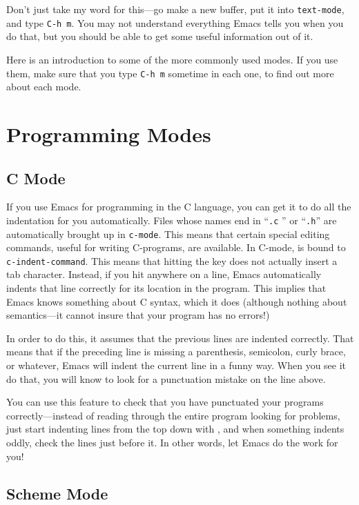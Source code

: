         Don't just take my word for this---go make a new buffer, put
it into {\tt text-mode}, and type {\tt C-h~m}.  You may not understand
everything Emacs tells you when you do that, but you should be able to
get some useful information out of it.

        Here is an introduction to some of the more commonly used
modes.  If you use them, make sure that you type {\tt C-h~m} sometime
in each one, to find out more about each mode.

\section{Programming Modes}

\subsection{C Mode}

        If you use Emacs for programming in the C language, you can
get it to do all the indentation for you automatically.  Files whose
names end in ``{\tt .c} '' or ``{\tt .h}'' are automatically brought
up in {\tt c-mode}.  This means that certain special editing commands,
useful for writing C-programs, are available.  In C-mode,  is
bound to {\tt c-indent-command}.  This means that hitting the
 key does not actually insert a tab character.  Instead, if
you hit  anywhere on a line, Emacs automatically indents
that line correctly for its location in the program.  This implies
that Emacs knows something about C syntax, which it does (although
nothing about semantics---it cannot insure that your program has no
errors!)

        In order to do this, it assumes that the previous lines are
indented correctly.  That means that if the preceding line is missing
a parenthesis, semicolon, curly brace, or whatever, Emacs will indent
the current line in a funny way.  When you see it do that, you will
know to look for a punctuation mistake on the line above.
        
        You can use this feature to check that you have punctuated
your programs correctly---instead of reading through the entire
program looking for problems, just start indenting lines from the top
down with , and when something indents oddly, check the
lines just before it.  In other words, let Emacs do the work for you!


\subsection{Scheme Mode}
%  

